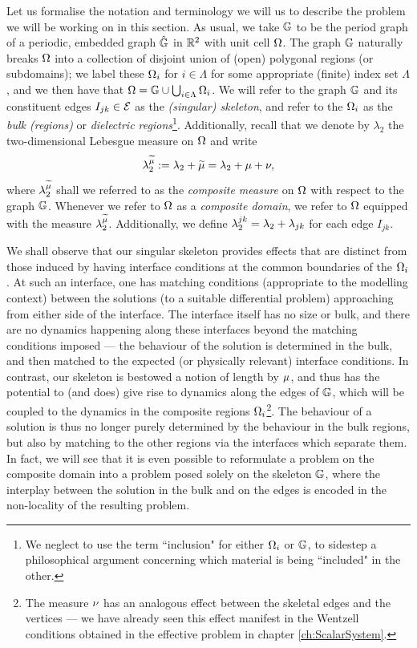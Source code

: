 Let us formalise the notation and terminology we will us to describe the problem we will be working on in this section.
As usual, we take $\mathbb{G}$ to be the period graph of a periodic, embedded graph $\hat{\mathbb{G}}$ in $\mathbb{R}^2$ with unit cell $\Omega$.
The graph $\mathbb{G}$ naturally breaks $\Omega$ into a collection of disjoint union of (open) polygonal regions (or subdomains); we label these $\Omega_i$ for $i\in\Lambda$ for some appropriate (finite) index set $\Lambda$, and we then have that $\Omega = \mathbb{G}\cup\bigcup_{i\in\Lambda}\Omega_i$.
We will refer to the graph $\mathbb{G}$ and its constituent edges $I_{jk}\in\mathcal{E}$ as the \emph{(singular) skeleton}, and refer to the $\Omega_i$ as the \emph{bulk (regions)} or \emph{dielectric regions}\footnote{We neglect to use the term ``inclusion" for either $\Omega_i$ or $\mathbb{G}$, to sidestep a philosophical argument concerning which material is being ``included" in the other.}.
Additionally, recall that we denote by $\lambda_2$ the two-dimensional Lebesgue measure on $\Omega$ and write
\begin{align*}
	\lambda_2^{\widetilde{\mu}} := \lambda_2 + \widetilde{\mu} = \lambda_2 + \mu + \nu,
\end{align*}
where $\lambda_2^{\widetilde{\mu}}$ shall we referred to as the \emph{composite measure} on $\Omega$ with respect to the graph $\mathbb{G}$.
Whenever we refer to $\Omega$ as a \emph{composite domain}, we refer to $\Omega$ equipped with the measure $\lambda_2^{\widetilde{\mu}}$.
Additionally, we define $\lambda_2^{jk} = \lambda_2 + \lambda_{jk}$ for each edge $I_{jk}$.

We shall observe that our singular skeleton provides effects that are distinct from those induced by having interface conditions at the common boundaries of the $\Omega_i$.
At such an interface, one has matching conditions (appropriate to the modelling context) between the solutions (to a suitable differential problem) approaching from either side of the interface.
The interface itself has no size or bulk, and there are no dynamics happening along these interfaces beyond the matching conditions imposed --- the behaviour of the solution is determined in the bulk, and then matched to the expected (or physically relevant) interface conditions.
In contrast, our skeleton is bestowed a notion of length by $\mu$, and thus has the potential to (and does) give rise to dynamics along the edges of $\mathbb{G}$, which will be coupled to the dynamics in the composite regions $\Omega_i$\footnote{The measure $\nu$ has an analogous effect between the skeletal edges and the vertices --- we have already seen this effect manifest in the Wentzell conditions obtained in the effective problem in chapter \ref{ch:ScalarSystem}.}.
The behaviour of a solution is thus no longer purely determined by the behaviour in the bulk regions, but also by matching to the other regions via the interfaces which separate them.
In fact, we will see that it is even possible to reformulate a problem on the composite domain into a problem posed solely on the skeleton $\mathbb{G}$, where the interplay between the solution in the bulk and on the edges is encoded in the non-locality of the resulting problem.

